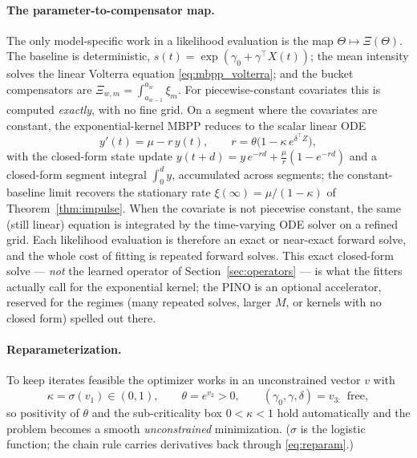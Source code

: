 \documentclass[11pt]{article}
\theoremstyle{plain}
\theoremstyle{definition}
\theoremstyle{remark}
\begin{document}
\paragraph{The parameter-to-compensator map.}
The only model-specific work in a likelihood evaluation is the map $\Theta\mapsto\Xi(\Theta)$. The baseline is deterministic, $s(t)=\exp(\gamma_0+\gamma^\top X(t))$; the mean intensity solves the linear Volterra equation \eqref{eq:mbpp_volterra}; and the bucket compensators are $\Xi_{w,m}=\int_{a_{w-1}}^{a_w}\xi_m$. For piecewise-constant covariates this is computed \emph{exactly}, with no fine grid. On a segment where the covariates are constant, the exponential-kernel MBPP reduces to the scalar linear ODE
\begin{equation}
y'(t)=\mu-r\,y(t),\qquad r=\theta\big(1-\kappa\,e^{\delta^\top Z}\big),
\label{eq:seg_ode}
\end{equation}
with the closed-form state update $y(t{+}d)=y\,e^{-rd}+\tfrac{\mu}{r}(1-e^{-rd})$ and a closed-form segment integral $\int_0^d y$, accumulated across segments; the constant-baseline limit recovers the stationary rate $\xi(\infty)=\mu/(1-\kappa)$ of Theorem~\ref{thm:impulse}. When the covariate is not piecewise constant, the same (still linear) equation is integrated by the time-varying ODE solver on a refined grid. Each likelihood evaluation is therefore an exact or near-exact forward solve, and the whole cost of fitting is repeated forward solves. This exact closed-form solve --- \emph{not} the learned operator of Section~\ref{sec:operators} --- is what the fitters actually call for the exponential kernel; the PINO is an optional accelerator, reserved for the regimes (many repeated solves, larger $M$, or kernels with no closed form) spelled out there.

\paragraph{Reparameterization.}
To keep iterates feasible the optimizer works in an unconstrained vector $v$ with
\begin{equation}
\kappa=\sigma(v_1)\in(0,1),\qquad \theta=e^{v_2}>0,\qquad (\gamma_0,\gamma,\delta)=v_{3:}\ \ \text{free},
\label{eq:reparam}
\end{equation}
so positivity of $\theta$ and the sub-criticality box $0<\kappa<1$ hold automatically and the problem becomes a smooth \emph{unconstrained} minimization. ($\sigma$ is the logistic function; the chain rule carries derivatives back through \eqref{eq:reparam}.)
\end{document}
